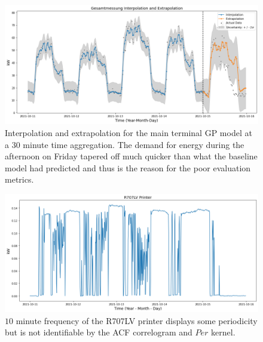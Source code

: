 
\begin{figure}[h]
\centering
\graphicspath{ {./images/} }
\includegraphics[scale=0.49]{images/gesamtmessung_model.png}
\caption{Interpolation and extrapolation for the main terminal GP model at a $30$ minute time aggregation. The demand for energy during the afternoon on Friday tapered off much quicker than what the baseline model had predicted and thus is the reason for the poor evaluation metrics.}
\label{fig:fig18}
\end{figure}


\begin{figure}[H]
\centering
\graphicspath{ {./images/} }
\includegraphics[scale=0.49]{images/r707lv_printer.png}
\caption{$10$ minute frequency of the R707LV printer displays some periodicity but is not identifiable by the ACF correlogram and $Per$ kernel.}
\label{fig:fig19}
\end{figure}

